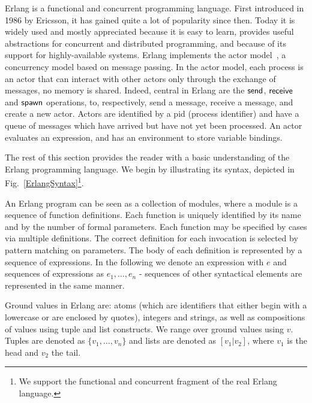 \documentclass{article}[12pt,a4paper]
\theoremstyle{definition}
\begin{document}
Erlang is a functional and concurrent programming language. First
introduced in 1986 by Ericsson, it has gained quite a lot of
popularity since then.  Today it is widely used and mostly appreciated
because it is easy to learn, provides useful abstractions for
concurrent and distributed programming, and because of its support for
highly-available systems. Erlang implements the actor model~\cite{Hewitt73}, a
concurrency model based on message passing. In the actor model, each
process is an actor that can interact with other actors
only through the exchange of messages, no memory is shared. Indeed,
central in Erlang are the $\mathsf{send}$, $\mathsf{receive}$ and $\mathsf{spawn}$
operations, to, respectively, send a message, receive a message, and
create a new actor. Actors are identified by a pid (process identifier) and have a queue of messages which have arrived but have not yet been processed.
An actor evaluates an expression, and has an environment to store variable bindings.

The rest of this section provides the reader with a basic understanding
of the Erlang programming language. We begin by illustrating its syntax, depicted in
Fig.~\ref{ErlangSyntax}\footnote{We support the functional and concurrent fragment of the
  real Erlang language.}. 

An Erlang program can be seen as a collection of modules, where a module is a sequence of function definitions. Each function is uniquely identified by its name and by the
number of formal parameters. Each function may be specified by cases via multiple definitions. The correct definition for each invocation is selected by pattern matching on parameters. The body of each definition is represented
by a sequence of expressions. In the following we denote an expression with $e$
and sequences of expressions as $e_1,\ldots,e_n$  - sequences of other
syntactical elements are represented in the same manner.  

Ground values in Erlang are: atoms (which are identifiers that either
begin with a lowercase or are enclosed by quotes), integers and
strings, as well as compositions of values using tuple and list
constructs. We range over ground values using $v$. Tuples are denoted
as $\{v_1,\ldots,v_n\}$ and lists are denoted as
$[v_1|v_2]$, where $v_1$ is the head and $v_2$ the tail.
\end{document}
